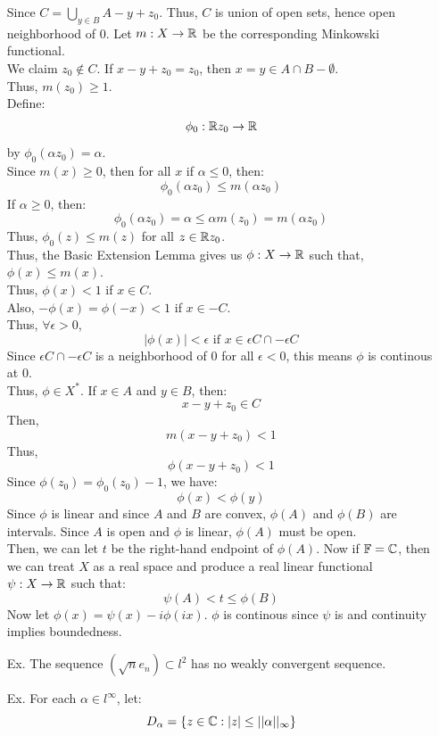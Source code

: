 \documentclass[12pt]{article}
\begin{document}
\begin{itemize}
    Since $C = \bigcup_{y \in B} A -y + z_0$. Thus, $C$ is union of open sets, hence open neighborhood of $0$. \bbni  
    Let $m: X \to \R$ be the corresponding Minkowski functional. \\
    We claim $z_0 \not \in C$. If $x-y+z_0 = z_0$, then $x = y \in A \cap B - \emptyset$. \\
    Thus, $m(z_0) \geq 1$. \\
    Define: 
    \[ \phi_0: \R z_0 \to \R\]
    by $\phi_0(\alpha z_0)  = \alpha$. \\
    Since $m(x) \geq 0$, then for all $x$ if $\alpha \leq 0$, then: 
    \[ \phi_0(\alpha z_0) \leq m(\alpha z_0)\]
    If $\alpha \geq 0$, then: 
    \[ \phi_0(\alpha z_0) = \alpha \leq \alpha m(z_0) = m(\alpha z_0)\]
    Thus, $\phi_0(z) \leq m(z)$ for all $z \in \R z_0$. \\
    Thus, the Basic Extension Lemma gives us $\phi: X \to \R$ such that, $\phi(x) \leq m(x)$. \\
    Thus, $\phi(x) < 1$ if $x \in C$. \\
    Also, $-\phi(x) = \phi(-x) < 1$ if $x \in -C$. \\
    Thus, $\forall \epsilon > 0$, 
    \[ |\phi(x)| < \epsilon \text{ if } x \in \epsilon C \cap -\epsilon C\]
    Since $\epsilon C \cap -\epsilon C$ is a neighborhood of $0$ for all $\epsilon < 0$, this means $\phi$ is continous at $0$. \\
    Thus, $\phi \in X^*$. If $x \in A$ and $y \in B$, then: 
    \[ x-y + z_0 \in C\]
    Then, 
    \[ m(x-y+z_0) < 1\]
    Thus, 
    \[ \phi(x-y+z_0) < 1\]
    Since $\phi(z_0) = \phi_0(z_0) - 1$, we have: 
    \[ \phi(x) < \phi(y)\]
    Since $\phi$ is linear and since $A$ and $B$ are convex, $\phi(A)$ and $\phi(B)$ are intervals. Since $A$ is open and $\phi$ is linear, $\phi(A)$ must be open. \\
    Then, we can let $t$ be the right-hand endpoint of $\phi(A)$. \bbni
    Now if $\mathbb{F} = \C$, then we can treat $X$ as a real space and produce a real linear functional $\psi: X \to \R$ such that: 
    \[ \psi(A) < t \leq \phi(B)\]
    Now let $\phi(x) = \psi(x) -i \phi(ix)$. $\phi$ is continous since $\psi$ is and continuity implies boundedness. 
    \newpage
    \item[Ex.] The sequence $(\sqrt{n}e_n) \subset l^2$ has no weakly convergent sequence. 
    \item[Ex.] For each $\alpha \in l^\infty$, let:
    \[ D_\alpha = \{z \in \mathbb C: |z| \leq ||\alpha||_\infty \}\]

\end{itemize}
\end{document}

